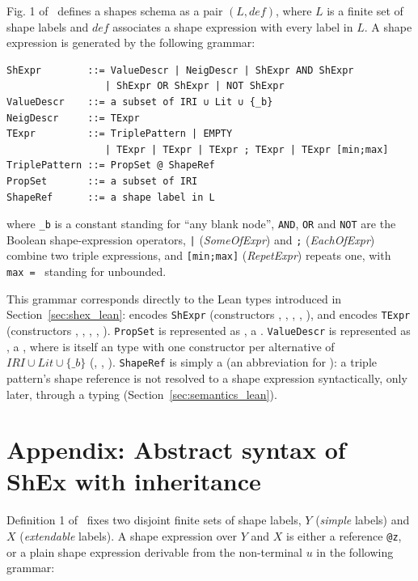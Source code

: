\documentclass[runningheads]{llncs}
\newcommand{\pcode}[1]{\texttt{\scriptsize #1}}
\begin{document}
Fig. 1 of~\cite{BGP17} defines a shapes schema as a pair $(L, def)$, where
$L$ is a finite set of shape labels and $def$ associates a shape
expression with every label in $L$. A shape expression is generated by
the following grammar:

\begingroup\scriptsize
\begin{verbatim}
ShExpr        ::= ValueDescr | NeigDescr | ShExpr AND ShExpr
                 | ShExpr OR ShExpr | NOT ShExpr
ValueDescr    ::= a subset of IRI ∪ Lit ∪ {_b}
NeigDescr     ::= TExpr
TExpr         ::= TriplePattern | EMPTY
                 | TExpr | TExpr | TExpr ; TExpr | TExpr [min;max]
TriplePattern ::= PropSet @ ShapeRef
PropSet       ::= a subset of IRI
ShapeRef      ::= a shape label in L
\end{verbatim}
\endgroup

where \pcode{\_b} is a constant standing for ``any blank node'',
\pcode{AND}, \pcode{OR} and \pcode{NOT} are the Boolean shape-expression
operators, \pcode{|} (\emph{SomeOfExpr}) and \pcode{;} (\emph{EachOfExpr})
combine two triple expressions, and \pcode{[min;max]} (\emph{RepetExpr})
repeats one, with \pcode{max}~\pcode{=}~\pcode{*} standing for
unbounded.

This grammar corresponds directly to the Lean types introduced in
Section~\ref{sec:shex_lean}:  encodes \pcode{ShExpr}
(constructors , , , ,
), and  encodes \pcode{TExpr} (constructors
, , , , ).
\pcode{PropSet} is represented as , a .
\pcode{ValueDescr} is represented as , a
, where  is itself an
 type with one constructor per alternative of
$IRI \cup Lit \cup \{\_b\}$ (, , ).
\pcode{ShapeRef} is simply a  (an abbreviation for
): a triple pattern's shape reference is not resolved to a
shape expression syntactically, only later, through a typing
(Section~\ref{sec:semantics_lean}).

\section{Appendix: Abstract syntax of ShEx with inheritance} \label{sec:appendixAbstractSyntaxShExInheritance}

Definition 1 of~\cite{ShExInheritance} fixes two disjoint finite sets of
shape labels, $Y$ (\emph{simple} labels) and $X$ (\emph{extendable}
labels). A shape expression over $Y$ and $X$ is either a reference
\pcode{@z}, or a plain shape expression derivable from the non-terminal
$u$ in the following grammar:
\end{document}
